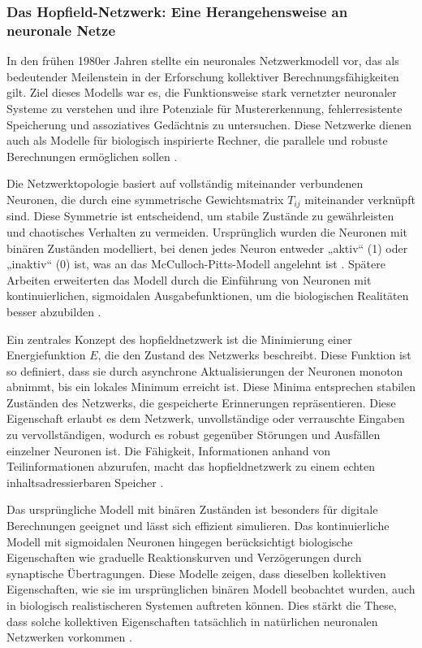 \subsubsection{Das Hopfield-Netzwerk: Eine Herangehensweise an neuronale Netze}
\label{chap:Das Hopfield-Netzwerk: Eine Herangehensweise an neuronale Netze}

In den frühen 1980er Jahren stellte \citeauthor{Hopfield1982} ein neuronales Netzwerkmodell vor, das als bedeutender Meilenstein in der Erforschung kollektiver Berechnungsfähigkeiten gilt. Ziel dieses Modells war es, die Funktionsweise stark vernetzter neuronaler Systeme zu verstehen und ihre Potenziale für Mustererkennung, fehlerresistente Speicherung und assoziatives Gedächtnis zu untersuchen. Diese Netzwerke dienen auch als Modelle für biologisch inspirierte Rechner, die parallele und robuste Berechnungen ermöglichen sollen \cite[vgl. S. 2554]{Hopfield1982} \cite[vgl. S. 3088]{Hopfield1984}.

Die Netzwerktopologie basiert auf vollständig miteinander verbundenen Neuronen, die durch eine symmetrische Gewichtsmatrix \(T_{ij}\) miteinander verknüpft sind. Diese Symmetrie ist entscheidend, um stabile Zustände zu gewährleisten und chaotisches Verhalten zu vermeiden. Ursprünglich wurden die Neuronen mit binären Zuständen modelliert, bei denen jedes Neuron entweder „aktiv“ (1) oder „inaktiv“ (0) ist, was an das McCulloch-Pitts-Modell angelehnt ist \cite[vgl. S. 2555]{Hopfield1982}. Spätere Arbeiten erweiterten das Modell durch die Einführung von Neuronen mit kontinuierlichen, sigmoidalen Ausgabefunktionen, um die biologischen Realitäten besser abzubilden \cite[vgl. S. 3088]{Hopfield1984}.

Ein zentrales Konzept des \gls{hopfieldnetzwerk} ist die Minimierung einer Energiefunktion \(E\), die den Zustand des Netzwerks beschreibt. Diese Funktion ist so definiert, dass sie durch asynchrone Aktualisierungen der Neuronen monoton abnimmt, bis ein lokales Minimum erreicht ist. Diese Minima entsprechen stabilen Zuständen des Netzwerks, die gespeicherte Erinnerungen repräsentieren. Diese Eigenschaft erlaubt es dem Netzwerk, unvollständige oder verrauschte Eingaben zu vervollständigen, wodurch es robust gegenüber Störungen und Ausfällen einzelner Neuronen ist. Die Fähigkeit, Informationen anhand von Teilinformationen abzurufen, macht das \gls{hopfieldnetzwerk} zu einem echten inhaltsadressierbaren Speicher \cite[vgl. S. 2554 f.]{Hopfield1982}.

Das ursprüngliche Modell mit binären Zuständen ist besonders für digitale Berechnungen geeignet und lässt sich effizient simulieren. Das kontinuierliche Modell mit sigmoidalen Neuronen hingegen berücksichtigt biologische Eigenschaften wie graduelle Reaktionskurven und Verzögerungen durch synaptische Übertragungen. Diese Modelle zeigen, dass dieselben kollektiven Eigenschaften, wie sie im ursprünglichen binären Modell beobachtet wurden, auch in biologisch realistischeren Systemen auftreten können. Dies stärkt die These, dass solche kollektiven Eigenschaften tatsächlich in natürlichen neuronalen Netzwerken vorkommen \cite[vgl. S. 3089]{Hopfield1984}.

